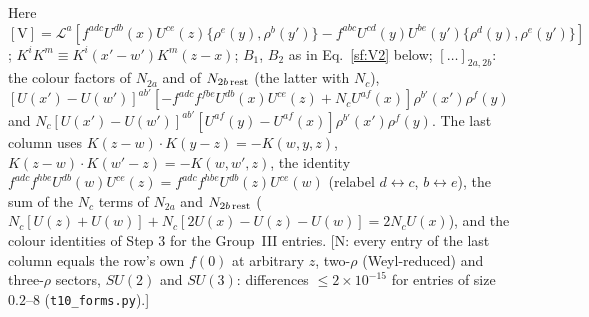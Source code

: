 \documentclass[10pt]{article}
\begin{document}
Here $[\text{V}]=\mathcal{L}^{a}[f^{adc}U^{db}(x)U^{ce}(z)\{\rho^{e}(y),\rho^{b}(y')\}-f^{abc}U^{cd}(y)U^{be}(y')\{\rho^{d}(y),\rho^{e}(y')\}]$; $K^{i}K^{m}\equiv K^{i}(x'-w')K^{m}(z-x)$; $B_{1}$, $B_{2}$ as in Eq.~\eqref{sf:V2} below; $[\dots]_{2a,2b}$: the colour factors of $N_{2a}$ and of $N_{2b\,\rm rest}$ (the latter with $N_{c}$), $[U(x')-U(w')]^{ab'}[-f^{adc}f^{fbe}U^{db}(x)U^{ce}(z)+N_{c}U^{af}(x)]\rho^{b'}(x')\rho^{f}(y)$ and $N_{c}[U(x')-U(w')]^{ab'}[U^{af}(y)-U^{af}(x)]\rho^{b'}(x')\rho^{f}(y)$. The last column uses $K(z-w)\cdot K(y-z)=-K(w,y,z)$, $K(z-w)\cdot K(w'-z)=-K(w,w',z)$, the identity $f^{adc}f^{hbe}U^{db}(w)U^{ce}(z)=f^{adc}f^{hbe}U^{db}(z)U^{ce}(w)$ (relabel $d\leftrightarrow c$, $b\leftrightarrow e$), the sum of the $N_{c}$ terms of $N_{2a}$ and $N_{2b\,\rm rest}$ ($N_{c}[U(z)+U(w)]+N_{c}[2U(x)-U(z)-U(w)]=2N_{c}U(x)$), and the colour identities of Step 3 for the Group~III entries. [N: every entry of the last column equals the row's own $f(0)$ at arbitrary $z$, two-$\rho$ (Weyl-reduced) and three-$\rho$ sectors, $SU(2)$ and $SU(3)$: differences $\le2\times10^{-15}$ for entries of size $0.2$--$8$ (\texttt{t10\_forms.py}).]
\end{document}
